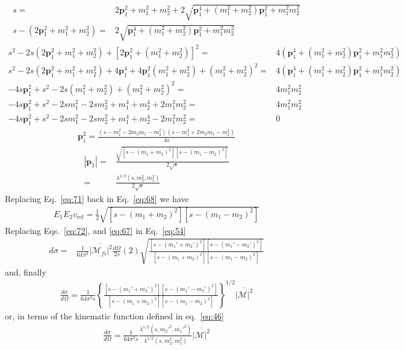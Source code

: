 \begin{align}
  \label{eq:70}
  s=&2\mathbf{p}_1^2+m_1^2+m_2^2+2\sqrt{\mathbf{p}_1^4+(m_1^2+m_2^2)\mathbf{p}_1^2+m_1^2m_2^2}\nonumber\\
s-(2\mathbf{p}_1^2+m_1^2+m_2^2)=&2\sqrt{\mathbf{p}_1^4+(m_1^2+m_2^2)\mathbf{p}_1^2+m_1^2m_2^2}
\end{align}
\begin{align}
  s^2-2s(2\mathbf{p}_1^2+m_1^2+m_2^2)+[2\mathbf{p}_1^2+(m_1^2+m_2^2)]^2=&4(\mathbf{p}_1^4+(m_1^2+m_2^2)\mathbf{p}_1^2+m_1^2m_2^2)\nonumber\\
  s^2-2s(2\mathbf{p}_1^2+m_1^2+m_2^2)+4\mathbf{p}_1^4+4\mathbf{p}_1^2(m_1^2+m_2^2)
+(m_1^2+m_2^2)^2=&4(\mathbf{p}_1^4+(m_1^2+m_2^2)\mathbf{p}_1^2+m_1^2m_2^2)\nonumber\\
-4s\mathbf{p}_1^2+s^2-2s(m_1^2+m_2^2)+(m_1^2+m_2^2)^2=&4m_1^2m_2^2\nonumber\\
-4s\mathbf{p}_1^2+s^2-2sm_1^2-2sm_2^2+m_1^4+m_2^4+2m_1^2m_2^2=&4m_1^2m_2^2\nonumber\\
-4s\mathbf{p}_1^2+s^2-2sm_1^2-2sm_2^2+m_1^4+m_2^4-2m_1^2m_2^2=&0
\end{align}
\begin{align}
  \mathbf{p}_1^2=\frac{\left(s-m_1^2-2 m_2 m_1-m_2^2\right)
   \left(s-m_1^2+2 m_2m_1-m_2^2\right)}
{4s}
\end{align}
\begin{align}
  \label{eq:71}
  |\mathbf{p}_1|=&\frac{\sqrt{[s-(m_1+m_2)^2][s-(m_1-m_2)^2]}}{2\sqrt{s}}\nonumber\\
=&\frac{\lambda^{1/2}(s,m_2^2,m_1^2)}{2\sqrt{s}}
\end{align}
Replacing Eq.~\eqref{eq:71} back in Eq.~\eqref{eq:68} we have
\begin{align}
  \label{eq:72}
  E_1E_2 v_{\text{rel}}=\frac{1}{2}\sqrt{[s-(m_1+m_2)^2][s-(m_1-m_2)^2]}
\end{align}
Replacing Eqs.~\eqref{eq:72}, and \eqref{eq:67} in Eq.~\eqref{eq:54}
\begin{align}
  \label{eq:73}
  d\sigma=&\frac{1}{64\pi^2}\overline{\left|\mathcal{M}_{fi}\right|^2}\frac{d\Omega}{2s}(2)
\sqrt{\frac{[s-(m_1'+m_2')^2][s-(m_1'-m_2')^2]}{[s-(m_1+m_2)^2][s-(m_1-m_2)^2]}}
\end{align}
and, finally
\begin{align}
  \frac{d\sigma}{d\Omega}=\frac{1}{64\pi^2s}\left\{
\frac{[s-(m_1'+m_2')^2][s-(m_1'-m_2')^2]}{[s-(m_1+m_2)^2][s-(m_1-m_2)^2]}\right\}^{1/2}
\overline{|\mathcal{M}|^2}
\end{align}
or, in terms of the kinematic function defined in eq.~\eqref{eq:46}
\begin{align}
  \label{eq:2bcs}
  \frac{d\sigma}{d\Omega}=\frac{1}{64\pi^2s}
\frac{\lambda^{1/2}(s,{m_2'}^2,{m_1'}^2)}{\lambda^{1/2}(s,m_2^2,m_1^2)}
\overline{|\mathcal{M}|^2}
\end{align}

